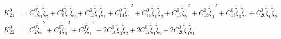 \begin{equation}
\begin{aligned}
K^0_{21} &= {C^{0}_{5}} {{\mathring{{\widetilde{{\xi}}}}}_{1}} {{\mathring{{\widetilde{{\xi}}}}}_{2}} + {C^{0}_{8}} {{\mathring{{\widetilde{{\xi}}}}}_{1}} {{\mathring{{\widetilde{{\xi}}}}}_{2}} + {C^{0}_{13}} {{\mathring{{\widetilde{{\xi}}}}}_{0}} {{\mathring{{\widetilde{{\xi}}}}}_{1}} + {C^{0}_{14}} {{\mathring{{\widetilde{{\xi}}}}}_{1}}^{2} + {C^{0}_{15}} {{\mathring{{\widetilde{{\xi}}}}}_{0}} {{\mathring{{\widetilde{{\xi}}}}}_{2}} + {C^{0}_{17}} {{\mathring{{\widetilde{{\xi}}}}}_{2}}^{2} + {C^{0}_{18}} {{\mathring{{\widetilde{{\xi}}}}}_{0}}^{2} + {C^{0}_{19}} {{\mathring{{\widetilde{{\xi}}}}}_{0}} {{\mathring{{\widetilde{{\xi}}}}}_{1}} + {C^{0}_{20}} {{\mathring{{\widetilde{{\xi}}}}}_{0}} {{\mathring{{\widetilde{{\xi}}}}}_{2}}\\
K^0_{22} &= {C^{0}_{2}} {{\mathring{{\widetilde{{\xi}}}}}_{2}}^{2} + {C^{0}_{4}} {{\mathring{{\widetilde{{\xi}}}}}_{0}}^{2} + {C^{0}_{5}} {{\mathring{{\widetilde{{\xi}}}}}_{1}}^{2} + 2 {C^{0}_{16}} {{\mathring{{\widetilde{{\xi}}}}}_{0}} {{\mathring{{\widetilde{{\xi}}}}}_{2}} + 2 {C^{0}_{17}} {{\mathring{{\widetilde{{\xi}}}}}_{1}} {{\mathring{{\widetilde{{\xi}}}}}_{2}} + 2 {C^{0}_{20}} {{\mathring{{\widetilde{{\xi}}}}}_{0}} {{\mathring{{\widetilde{{\xi}}}}}_{1}}\\
\end{aligned}\end{equation}

